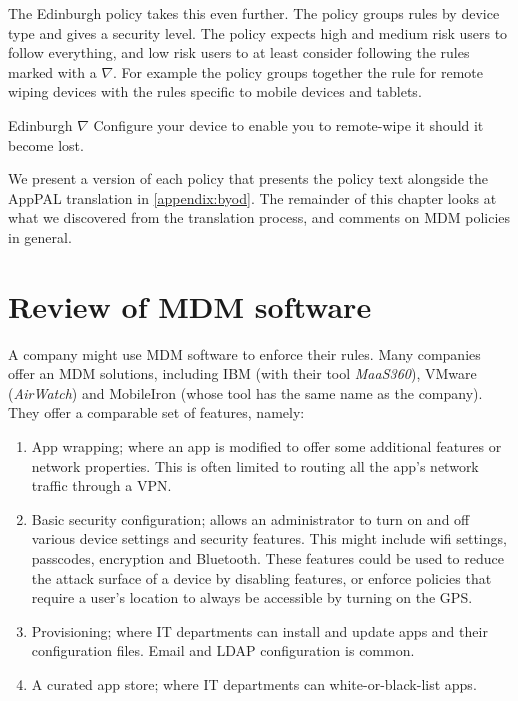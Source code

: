 \documentclass[thesis.tex]{subfiles}
\begin{document}
The Edinburgh policy takes this even further. The policy groups rules by device type
and gives a security level.  The policy expects high and medium risk users
to follow everything, and low risk users to at least
consider following the rules marked with a $\nabla$.  For example the policy groups together the
rule for remote wiping devices with the rules specific to mobile
devices and tablets. 

\begin{policyrule}{Edinburgh}
  $\nabla$ Configure your device to enable you to remote-wipe it should it become lost.
\end{policyrule}

We present a version of each policy that presents the policy text
alongside the AppPAL translation in \autoref{appendix:byod}.  The
remainder of this chapter looks at what we discovered from the
translation process, and comments on \ac{MDM} policies in general.

\section{Review of MDM software}

A company might use \ac{MDM} software to enforce their rules.  Many
companies offer an \ac{MDM} solutions, including IBM (with their tool
\emph{MaaS360}), VMware (\emph{AirWatch}) and MobileIron (whose tool
has the same name as the company). They offer a comparable set of
features, namely:
\begin{enumerate}
\item App wrapping; where an app is modified to offer some additional
  features or network properties. This is often limited to routing all
  the app's network traffic through a VPN.
\item Basic security configuration; allows an administrator to turn on
  and off various device settings and security features. This might
  include wifi settings, passcodes, encryption and Bluetooth.  These
  features could be used to reduce the attack surface of a device by
  disabling features, or enforce policies that require a user's location
  to always be accessible by turning on the GPS.
\item Provisioning; where IT departments can install and update apps and
  their configuration files. Email and LDAP configuration is common.
\item A curated app store; where IT departments can white-or-black-list apps.
\end{enumerate}
\end{document}

